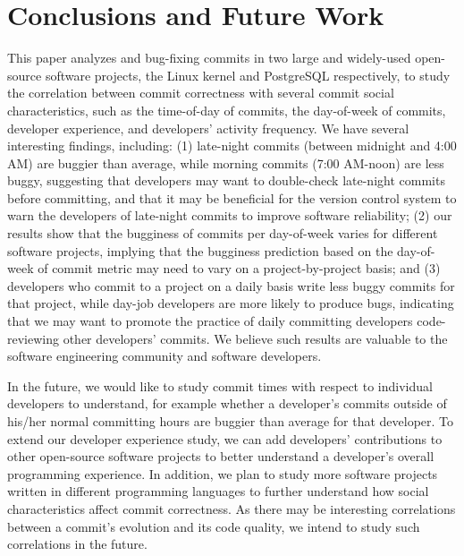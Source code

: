 \section{Conclusions and Future Work}
\label{sec-conclusion}

This paper analyzes \linuxBFC and \postBFC bug-fixing commits in two large and
widely-used open-source software projects, the Linux kernel and PostgreSQL
respectively, to study the correlation between commit correctness with several
commit social characteristics, such as the time-of-day of commits, the
day-of-week of commits, developer experience, and developers' activity
frequency. We have several interesting findings, including: (1) late-night
commits (between midnight and 4:00 AM) are buggier than average, while morning
commits (7:00 AM-noon) are less buggy, suggesting that developers may want to
double-check late-night commits before committing, and that it may be beneficial
for the version control system to warn the developers of late-night commits to
improve software reliability; (2) our results show that the bugginess of commits
per day-of-week varies for different software projects, implying that the
bugginess prediction based on the day-of-week of commit metric may need to vary
on a project-by-project basis; and (3) developers who commit to a project on a
daily basis write less buggy commits for that project, while day-job developers
are more likely to produce bugs, indicating that we may want to promote the
practice of daily committing developers code-reviewing other developers'
commits.  We believe such results are valuable to the software engineering
community and software developers.

In the future, we would like to study commit times with respect to individual
developers to understand, for example whether a developer's commits outside of
his/her normal committing hours are buggier than average for that developer.  To
extend our developer experience study, we can add developers' contributions to
other open-source software projects to better understand a developer's overall
programming experience.  In addition, we plan to study more software projects
written in different programming languages to further understand how social
characteristics affect commit correctness.  As there may be interesting
correlations between a commit's evolution and its code quality, we intend to
study such correlations in the future.


